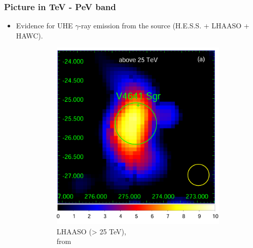 \documentclass[10pt,aspectratio=169,mathserif]{beamer}
\begin{document}

\begin{frame}
  \frametitle{Picture in TeV - PeV band}

  \begin{itemize}
    \item Evidence for UHE $\gamma$-ray emission from the source (H.E.S.S. + LHAASO + HAWC).
\begin{figure}[ht]
    \centering
    \begin{subfigure}[t]{0.29\linewidth}
        \includegraphics[width=\linewidth]{LHAASO-V4641.png}
        \caption{LHAASO (> 25 TeV),\\from \cite{lhaaso2024ultrahigh}}
        \label{fig:sub1}
    \end{subfigure}%
    \hfill %
    \begin{subfigure}[t]{0.30\linewidth}

\end{subfigure}
\end{figure}
\end{itemize}
\end{frame}
\end{document}
